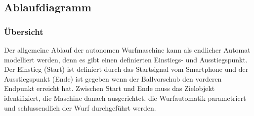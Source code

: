 \subsection{Ablaufdiagramm}
\label{ss_ablaufdiagramm}

\subsubsection{Übersicht}
Der allgemeine Ablauf der autonomen Wurfmaschine kann als endlicher Automat
modelliert werden, denn es gibt einen definierten Einstiegs- und 
Ausstiegspunkt. Der Einstieg (Start) ist definiert durch das Startsignal vom Smartphone und der Ausstiegspunkt (Ende) ist gegeben wenn der Ballvorschub den vorderen Endpunkt erreicht hat. Zwischen Start und Ende muss das Zielobjekt
identifiziert, die Maschine danach ausgerichtet, die Wurfautomatik
parametriert und schlussendlich der Wurf durchgeführt werden.



